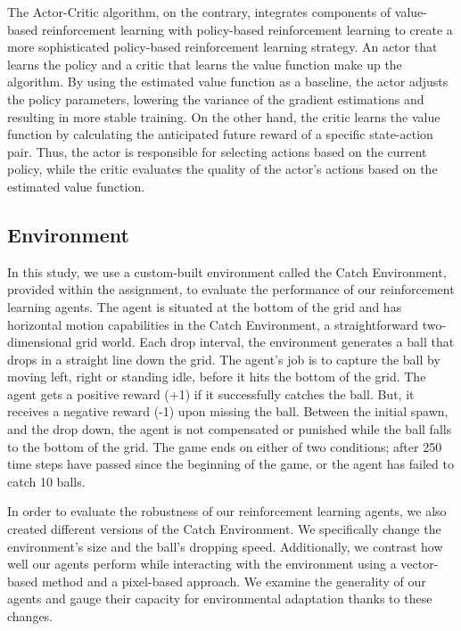 \documentclass{article}
\begin{document}
The Actor-Critic algorithm, on the contrary, integrates components of value-based reinforcement learning with policy-based reinforcement learning to create a more sophisticated policy-based reinforcement learning strategy.
An actor that learns the policy and a critic that learns the value function make up the algorithm.
By using the estimated value function as a baseline, the actor adjusts the policy parameters, lowering the variance of the gradient estimations and resulting in more stable training.
On the other hand, the critic learns the value function by calculating the anticipated future reward of a specific state-action pair.
Thus, the actor is responsible for selecting actions based on the current policy, while the critic evaluates the quality of the actor's actions based on the estimated value function.

\subsection{Environment}
\label{I-Environment}
In this study, we use a custom-built environment called the Catch Environment, provided within the assignment, to evaluate the performance of our reinforcement learning agents.
The agent is situated at the bottom of the grid and has horizontal motion capabilities in the Catch Environment, a straightforward two-dimensional grid world.
Each drop interval, the environment generates a ball that drops in a straight line down the grid. 
The agent's job is to capture the ball by moving left, right or standing idle, before it hits the bottom of the grid. 
The agent gets a positive reward (+1) if it successfully catches the ball.
But, it receives a negative reward (-1) upon missing the ball. 
Between the initial spawn, and the drop down, the agent is not compensated or punished while the ball falls to the bottom of the grid.
The game ends on either of two conditions; after 250 time steps have passed since the beginning of the game,  or the agent has failed to catch 10 balls.

In order to evaluate the robustness of our reinforcement learning agents, we also created different versions of the Catch Environment.
We specifically change the environment's size and the ball's dropping speed.
Additionally, we contrast how well our agents perform while interacting with the environment using a vector-based method and a pixel-based approach.
We  examine the generality of our agents and gauge their capacity for environmental adaptation thanks to these changes.
\end{document}
